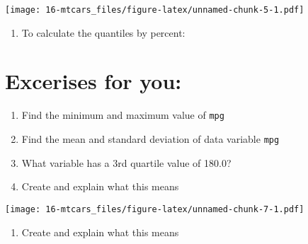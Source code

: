 \documentclass[
]{book}
\newenvironment{Shaded}{\begin{snugshade}}{\end{snugshade}}
\newcommand{\CommentTok}[1]{\textcolor[rgb]{0.56,0.35,0.01}{\textit{#1}}}
\newcommand{\DecValTok}[1]{\textcolor[rgb]{0.00,0.00,0.81}{#1}}
\newcommand{\FunctionTok}[1]{\textcolor[rgb]{0.00,0.00,0.00}{#1}}
\newcommand{\NormalTok}[1]{#1}
\newcommand{\SpecialCharTok}[1]{\textcolor[rgb]{0.00,0.00,0.00}{#1}}
\providecommand{\tightlist}{%
  \setlength{\itemsep}{0pt}\setlength{\parskip}{0pt}}
\begin{document}
\texttt{[image: 16-mtcars\_files/figure-latex/unnamed-chunk-5-1.pdf]}

\begin{enumerate}
\def\labelenumi{\arabic{enumi}.}
\setcounter{enumi}{5}
\tightlist
\item
  To calculate the quantiles by percent:
\end{enumerate}

\begin{Shaded}
\end{Shaded}

\hypertarget{excerises-for-you}{%
\section{Excerises for you:}\label{excerises-for-you}}

\begin{enumerate}
\def\labelenumi{\arabic{enumi}.}
\item
  Find the minimum and maximum value of \texttt{mpg}
\item
  Find the mean and standard deviation of data variable \texttt{mpg}
\item
  What variable has a 3rd quartile value of 180.0?
\item
  Create and explain what this means
\end{enumerate}

\texttt{[image: 16-mtcars\_files/figure-latex/unnamed-chunk-7-1.pdf]}

\begin{enumerate}
\def\labelenumi{\arabic{enumi}.}
\setcounter{enumi}{4}
\tightlist
\item
  Create and explain what this means
\end{enumerate}
\end{document}
